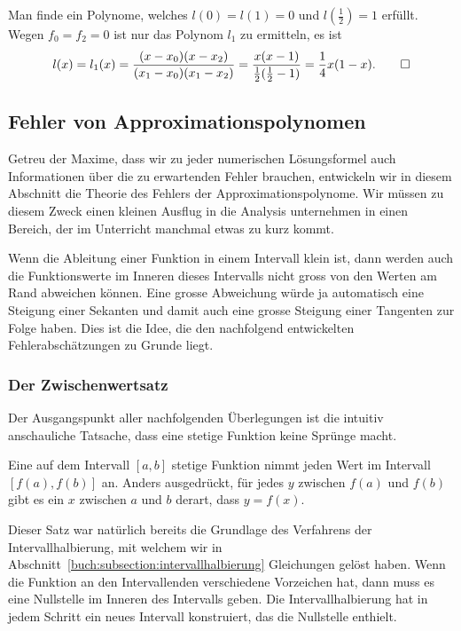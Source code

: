 \begin{beispiel}
Man finde ein Polynome, welches $l(0)=l(1)=0$ und $l(\frac12)=1$
erfüllt.
Wegen $f_0=f_2=0$ ist nur das Polynom $l_1$ zu ermitteln, es ist
\[
l(x) = l_1(x)
=
\frac{(x-x_0)(x-x_2)}{(x_1-x_0)(x_1-x_2)}
=
\frac{x(x-1)}{\frac12(\frac12-1)}
=
\frac14x(1-x).
\qedhere
\]
\end{beispiel}

%
%
\subsection{Fehler von Approximationspolynomen
\label{buch:section:interpolation:fehler}}
Getreu der Maxime, dass wir zu jeder numerischen Lösungsformel auch
Informationen über die zu erwartenden Fehler brauchen, entwickeln
wir in diesem Abschnitt die Theorie des Fehlers der Approximationspolynome.
%
Wir müssen zu diesem Zweck einen kleinen Ausflug in die Analysis unternehmen
in einen Bereich, der im Unterricht manchmal etwas zu kurz kommt.

Wenn die Ableitung einer Funktion in einem Intervall klein ist,
dann werden auch die Funktionswerte im Inneren dieses Intervalls
nicht gross von den Werten am Rand abweichen können.
Eine grosse Abweichung würde ja automatisch eine Steigung einer Sekanten
und damit auch eine grosse Steigung einer Tangenten zur Folge haben.
%
%
Dies ist die Idee, die den nachfolgend entwickelten Fehlerabschätzungen
zu Grunde liegt.
%

\subsubsection{Der Zwischenwertsatz}
%
Der Ausgangspunkt aller nachfolgenden Überlegungen ist die intuitiv
anschauliche Tatsache, dass eine stetige Funktion keine Sprünge macht.

\begin{satz}[Zwischenwertsatz]
Eine auf dem Intervall $[a,b]$ stetige Funktion nimmt jeden Wert im
Intervall $[f(a),f(b)]$ an.
Anders ausgedrückt, für jedes $y$ zwischen $f(a)$ und $f(b)$ gibt es ein 
$x$ zwischen $a$ und $b$ derart, dass $y=f(x)$.
\end{satz}

Dieser Satz war natürlich bereits die Grundlage des Verfahrens der
Intervallhalbierung, mit welchem wir in
Abschnitt~\ref{buch:subsection:intervallhalbierung}
Gleichungen gelöst haben.
%
Wenn die Funktion an den Intervallenden verschiedene Vorzeichen hat,
dann muss es eine Nullstelle im Inneren des Intervalls geben.
%
Die Intervallhalbierung hat in jedem Schritt ein neues Intervall
konstruiert, das die Nullstelle enthielt.

